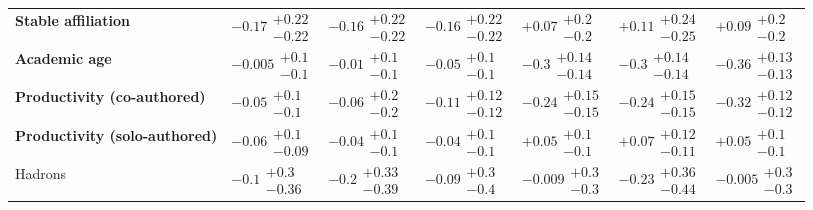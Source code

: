 \begin{table}[H]
\begin{tabular}{lllllll}
\textbf{Stable affiliation}               &       $-0.17\substack{+0.22 \\ -0.22}$ &       $-0.16\substack{+0.22 \\ -0.22}$ &       $-0.16\substack{+0.22 \\ -0.22}$ &         $+0.07\substack{+0.2 \\ -0.2}$ &       $+0.11\substack{+0.24 \\ -0.25}$ &         $+0.09\substack{+0.2 \\ -0.2}$ \\
\textbf{Academic age}                     &        $-0.005\substack{+0.1 \\ -0.1}$ &         $-0.01\substack{+0.1 \\ -0.1}$ &         $-0.05\substack{+0.1 \\ -0.1}$ &   $\bm{-0.3}\substack{+0.14 \\ -0.14}$ &   $\bm{-0.3}\substack{+0.14 \\ -0.14}$ &  $\bm{-0.36}\substack{+0.13 \\ -0.13}$ \\
\textbf{Productivity (co-authored)}       &         $-0.05\substack{+0.1 \\ -0.1}$ &         $-0.06\substack{+0.2 \\ -0.2}$ &       $-0.11\substack{+0.12 \\ -0.12}$ &  $\bm{-0.24}\substack{+0.15 \\ -0.15}$ &  $\bm{-0.24}\substack{+0.15 \\ -0.15}$ &  $\bm{-0.32}\substack{+0.12 \\ -0.12}$ \\
\textbf{Productivity (solo-authored)}     &        $-0.06\substack{+0.1 \\ -0.09}$ &         $-0.04\substack{+0.1 \\ -0.1}$ &         $-0.04\substack{+0.1 \\ -0.1}$ &         $+0.05\substack{+0.1 \\ -0.1}$ &       $+0.07\substack{+0.12 \\ -0.11}$ &         $+0.05\substack{+0.1 \\ -0.1}$ \\
\hline Hadrons                                   &         $-0.1\substack{+0.3 \\ -0.36}$ &        $-0.2\substack{+0.33 \\ -0.39}$ &         $-0.09\substack{+0.3 \\ -0.4}$ &        $-0.009\substack{+0.3 \\ -0.3}$ &       $-0.23\substack{+0.36 \\ -0.44}$ &        $-0.005\substack{+0.3 \\ -0.3}$ \\

\end{tabular}
\end{table}
